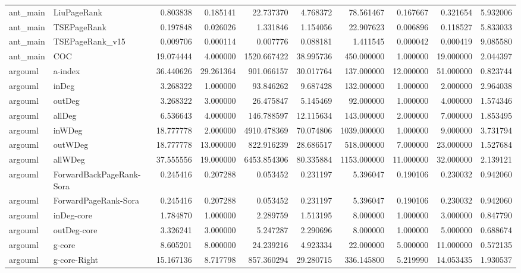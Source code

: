 \begin{tabular}{llrrrrrrrr}
ant_main & LiuPageRank & 0.803838 & 0.185141 & 22.737370 & 4.768372 & 78.561467 & 0.167667 & 0.321654 & 5.932006 \\
ant_main & TSEPageRank & 0.197848 & 0.026026 & 1.331846 & 1.154056 & 22.907623 & 0.006896 & 0.118527 & 5.833033 \\
ant_main & TSEPageRank_v15 & 0.009706 & 0.000114 & 0.007776 & 0.088181 & 1.411545 & 0.000042 & 0.000419 & 9.085580 \\
ant_main & COC & 19.074444 & 4.000000 & 1520.667422 & 38.995736 & 450.000000 & 1.000000 & 19.000000 & 2.044397 \\
argouml & a-index & 36.440626 & 29.261364 & 901.066157 & 30.017764 & 137.000000 & 12.000000 & 51.000000 & 0.823744 \\
argouml & inDeg & 3.268322 & 1.000000 & 93.846262 & 9.687428 & 132.000000 & 1.000000 & 2.000000 & 2.964038 \\
argouml & outDeg & 3.268322 & 3.000000 & 26.475847 & 5.145469 & 92.000000 & 1.000000 & 4.000000 & 1.574346 \\
argouml & allDeg & 6.536643 & 4.000000 & 146.788597 & 12.115634 & 143.000000 & 2.000000 & 7.000000 & 1.853495 \\
argouml & inWDeg & 18.777778 & 2.000000 & 4910.478369 & 70.074806 & 1039.000000 & 1.000000 & 9.000000 & 3.731794 \\
argouml & outWDeg & 18.777778 & 13.000000 & 822.916239 & 28.686517 & 518.000000 & 7.000000 & 23.000000 & 1.527684 \\
argouml & allWDeg & 37.555556 & 19.000000 & 6453.854306 & 80.335884 & 1153.000000 & 11.000000 & 32.000000 & 2.139121 \\
argouml & ForwardBackPageRank-Sora & 0.245416 & 0.207288 & 0.053452 & 0.231197 & 5.396047 & 0.190106 & 0.230032 & 0.942060 \\
argouml & ForwardPageRank-Sora & 0.245416 & 0.207288 & 0.053452 & 0.231197 & 5.396047 & 0.190106 & 0.230032 & 0.942060 \\
argouml & inDeg-core & 1.784870 & 1.000000 & 2.289759 & 1.513195 & 8.000000 & 1.000000 & 3.000000 & 0.847790 \\
argouml & outDeg-core & 3.326241 & 3.000000 & 5.247287 & 2.290696 & 8.000000 & 1.000000 & 5.000000 & 0.688674 \\
argouml & g-core & 8.605201 & 8.000000 & 24.239216 & 4.923334 & 22.000000 & 5.000000 & 11.000000 & 0.572135 \\
argouml & g-core-Right & 15.167136 & 8.717798 & 857.360294 & 29.280715 & 336.145800 & 5.219990 & 14.053435 & 1.930537 \\

\end{tabular}
